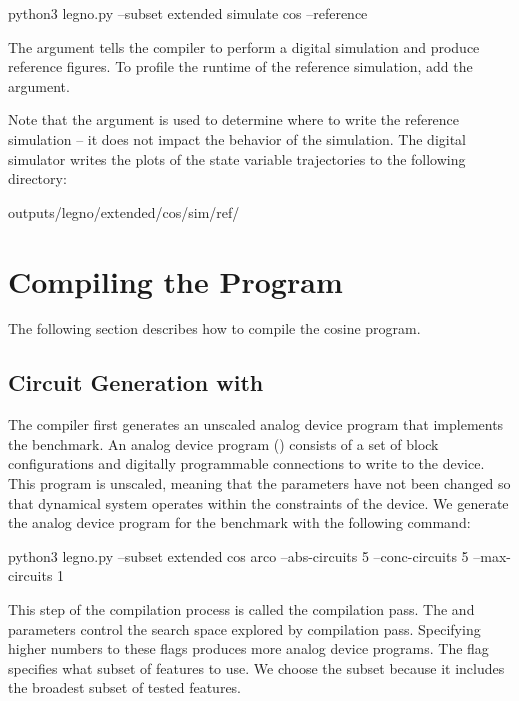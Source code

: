 \begin{snippet}
  python3 legno.py --subset extended simulate cos --reference
\end{snippet}

The  argument tells the compiler to perform a digital
simulation and produce reference figures. To profile the runtime of the
reference simulation, add the  argument.

Note that the  argument is used to determine where to write the reference
simulation -- it does not impact the behavior of the simulation. The digital simulator
writes the plots of the state variable trajectories to the following directory:

\begin{snippet}
  outputs/legno/extended/cos/sim/ref/
\end{snippet}

\section{Compiling the  Program}

The following section describes how to compile the cosine program.

\subsection{Circuit Generation with }

The \legno compiler first generates an unscaled analog device program that
implements the  benchmark. An analog device program ()
consists of a set of block configurations and digitally programmable connections
to write to the device. This program is unscaled, meaning that the parameters
have not been changed so that dynamical system operates within the constraints
of the device. We generate the analog device program for the  benchmark
with the following command:

\begin{snippet}
  python3 legno.py --subset extended cos arco --abs-circuits 5 
      --conc-circuits 5 --max-circuits 1
\end{snippet}

This step of the compilation process is called the \lgraph compilation pass. The
 and  parameters control the search
space explored by \lgraph compilation pass. Specifying higher numbers to these
flags produces more analog device programs. The  flag specifies
what subset of features to use. We choose the  subset because it
includes the broadest subset of tested features.

